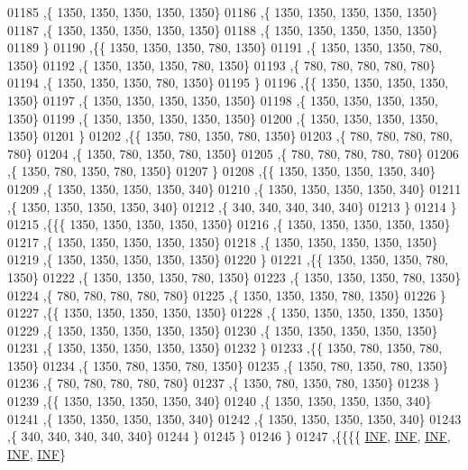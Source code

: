\begin{DoxyCode}
01185    ,\{  1350,  1350,  1350,  1350,  1350\}
01186    ,\{  1350,  1350,  1350,  1350,  1350\}
01187    ,\{  1350,  1350,  1350,  1350,  1350\}
01188    ,\{  1350,  1350,  1350,  1350,  1350\}
01189    \}
01190   ,\{\{  1350,  1350,  1350,   780,  1350\}
01191    ,\{  1350,  1350,  1350,   780,  1350\}
01192    ,\{  1350,  1350,  1350,   780,  1350\}
01193    ,\{   780,   780,   780,   780,   780\}
01194    ,\{  1350,  1350,  1350,   780,  1350\}
01195    \}
01196   ,\{\{  1350,  1350,  1350,  1350,  1350\}
01197    ,\{  1350,  1350,  1350,  1350,  1350\}
01198    ,\{  1350,  1350,  1350,  1350,  1350\}
01199    ,\{  1350,  1350,  1350,  1350,  1350\}
01200    ,\{  1350,  1350,  1350,  1350,  1350\}
01201    \}
01202   ,\{\{  1350,   780,  1350,   780,  1350\}
01203    ,\{   780,   780,   780,   780,   780\}
01204    ,\{  1350,   780,  1350,   780,  1350\}
01205    ,\{   780,   780,   780,   780,   780\}
01206    ,\{  1350,   780,  1350,   780,  1350\}
01207    \}
01208   ,\{\{  1350,  1350,  1350,  1350,   340\}
01209    ,\{  1350,  1350,  1350,  1350,   340\}
01210    ,\{  1350,  1350,  1350,  1350,   340\}
01211    ,\{  1350,  1350,  1350,  1350,   340\}
01212    ,\{   340,   340,   340,   340,   340\}
01213    \}
01214   \}
01215  ,\{\{\{  1350,  1350,  1350,  1350,  1350\}
01216    ,\{  1350,  1350,  1350,  1350,  1350\}
01217    ,\{  1350,  1350,  1350,  1350,  1350\}
01218    ,\{  1350,  1350,  1350,  1350,  1350\}
01219    ,\{  1350,  1350,  1350,  1350,  1350\}
01220    \}
01221   ,\{\{  1350,  1350,  1350,   780,  1350\}
01222    ,\{  1350,  1350,  1350,   780,  1350\}
01223    ,\{  1350,  1350,  1350,   780,  1350\}
01224    ,\{   780,   780,   780,   780,   780\}
01225    ,\{  1350,  1350,  1350,   780,  1350\}
01226    \}
01227   ,\{\{  1350,  1350,  1350,  1350,  1350\}
01228    ,\{  1350,  1350,  1350,  1350,  1350\}
01229    ,\{  1350,  1350,  1350,  1350,  1350\}
01230    ,\{  1350,  1350,  1350,  1350,  1350\}
01231    ,\{  1350,  1350,  1350,  1350,  1350\}
01232    \}
01233   ,\{\{  1350,   780,  1350,   780,  1350\}
01234    ,\{  1350,   780,  1350,   780,  1350\}
01235    ,\{  1350,   780,  1350,   780,  1350\}
01236    ,\{   780,   780,   780,   780,   780\}
01237    ,\{  1350,   780,  1350,   780,  1350\}
01238    \}
01239   ,\{\{  1350,  1350,  1350,  1350,   340\}
01240    ,\{  1350,  1350,  1350,  1350,   340\}
01241    ,\{  1350,  1350,  1350,  1350,   340\}
01242    ,\{  1350,  1350,  1350,  1350,   340\}
01243    ,\{   340,   340,   340,   340,   340\}
01244    \}
01245   \}
01246  \}
01247 ,\{\{\{\{   \mbox{\hyperlink{1_88_84__epars_8h_a12c2040f25d8e3a7b9e1c2024c618cb6}{INF}},   \mbox{\hyperlink{1_88_84__epars_8h_a12c2040f25d8e3a7b9e1c2024c618cb6}{INF}},   \mbox{\hyperlink{1_88_84__epars_8h_a12c2040f25d8e3a7b9e1c2024c618cb6}{INF}},   \mbox{\hyperlink{1_88_84__epars_8h_a12c2040f25d8e3a7b9e1c2024c618cb6}{INF}},   \mbox{\hyperlink{1_88_84__epars_8h_a12c2040f25d8e3a7b9e1c2024c618cb6}{INF}}\}

\end{DoxyCode}
